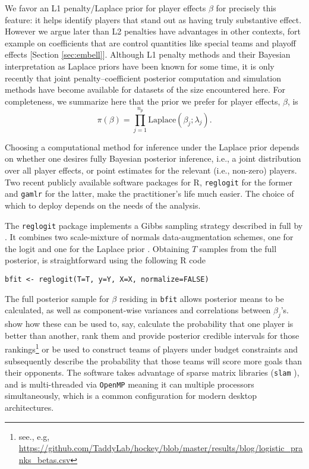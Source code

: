 We favor an L1 penalty/Laplace prior for player effects $\beta$ for precisely
this feature: it helps identify players that stand out as having truly
substantive effect.  However we argue later than L2 penalties have advantages
in other contexts, fort example on coefficients that are control quantities
like special teams and playoff effects [Section \ref{sec:embell}]. Although L1
penalty methods and their Bayesian interpretation as Laplace priors have been
known for some time, it is only recently that joint penalty--coefficient
posterior computation and simulation methods have become available for
datasets of the size encountered here.  For completeness, we summarize here
that the prior we prefer for player effects, $\beta$, is
\begin{equation}
\pi(\beta) = \prod_{j=1}^{n_p} \mathrm{Laplace}(\beta_j; \lambda_j).
\end{equation}

Choosing a computational method for inference under the Laplace prior depends
on whether one desires fully Bayesian posterior inference, i.e., a joint
distribution over all player effects, or point estimates for the relevant
(i.e., non-zero) players.  Two recent publicly available software packages
for {\sf R}, {\tt reglogit} \cite{reglogit} for the former and {\tt gamlr}
\cite{gamlr} for the latter, make the practitioner's life much easier. The
choice of which to deploy depends on the needs of the analysis. 

The {\tt reglogit} package implements a Gibbs sampling strategy
\cite{gem:gem:1984} described in full by \cite{gra:pols:2012}.  It combines
two scale-mixture of normals data-augmentation schemes, one for the logit
\cite{holmes:held:2006} and one for the Laplace prior \cite{park:casella:2008}.
Obtaining $T$ samples from the full posterior, is straightforward using the
following {\sf R} code
\begin{verbatim}
bfit <- reglogit(T=T, y=Y, X=X, normalize=FALSE)
\end{verbatim}
The full posterior sample for $\beta$ residing in {\tt bfit} allows posterior
means to be calculated, as well as component-wise variances and correlations
between $\beta_j$'s.  \cite{gramacy:jensen:taddy:2013} show how these can be
used to, say, calculate the probability that one player is better than
another, rank them and provide posterior credible intervals for those
rankings\footnote{see., e.g, 
\url{https://github.com/TaddyLab/hockey/blob/master/results/blog/logistic_pranks_betas.csv}
} or be used to construct teams of players under budget constraints and
subsequently describe the probability that those teams will score more goals
than their opponents.  The software takes advantage of sparse matrix libraries
({\tt slam} \cite{slam}), and is multi-threaded via {\tt OpenMP} meaning it 
can multiple processors simultaneously, which is a common
configuration for modern desktop architectures.


